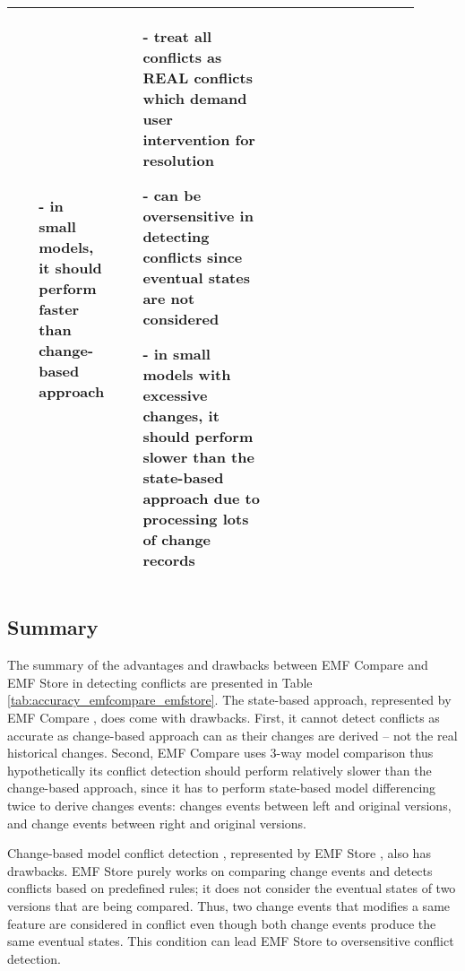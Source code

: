 \begin{table*}[ht]
\begin{scriptsize}
\begin{tabular}{|p{0.1\linewidth}|p{0.4\linewidth}|p{0.4\linewidth}|}
\begin{minipage}[t]{\linewidth}
\begin{itemize}[leftmargin=9pt]
        \item[-] in small models, it should perform faster than change-based approach
        \item[]
      \end{itemize}
    \end{minipage}
    &
    \begin{minipage}[t]{\linewidth}
      \raggedright
      \begin{itemize}[leftmargin=9pt]
        \setlength\itemsep{2pt}
        \item[-] treat all conflicts as \textsf{REAL} conflicts which demand user intervention for resolution
        \item[-] can be oversensitive in detecting conflicts since eventual states are not considered
        \item[-] in small models with excessive changes, it should perform slower than the state-based approach due to processing lots of change records
        \item[]
      \end{itemize} 
    \end{minipage}
    \\
    \hline                         
  \end{tabular}
\end{scriptsize}
\end{table*}

\subsection{Summary}
\label{sec:summary}
The summary of the advantages and drawbacks between EMF Compare and EMF Store in detecting conflicts are presented in Table \ref{tab:accuracy_emfcompare_emfstore}. The state-based approach, represented by EMF Compare \cite{emfcompare2018developer}, does come with drawbacks. First, it cannot detect conflicts as accurate as change-based approach can as their changes are derived -- not the real historical changes. Second, EMF Compare uses 3-way model comparison \cite{emfcompare2018developer} thus hypothetically its conflict detection should perform relatively slower than the change-based approach, since it has to perform state-based model differencing twice to derive changes events: changes events between left and original versions, and change events between right and original versions. 

Change-based model conflict detection \cite{koegel2010operation}, represented by EMF Store \cite{emfstore2019what}, also has drawbacks. EMF Store purely works on comparing change events and detects conflicts based on predefined rules; it does not consider the eventual states of two versions that are being compared. Thus, two change events that modifies a same feature are considered in conflict even though both change events produce the same eventual states. This condition can lead EMF Store to oversensitive conflict detection. 

